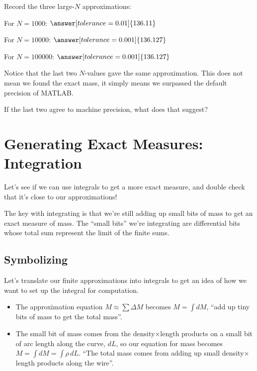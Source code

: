 \documentclass{ximera}
\begin{document}
\begin{problem}
Record the three large-$N$ approximations:

For $N=1000$: $\answer[tolerance=0.01]{136.11}$

For $N=10000$: $\answer[tolerance=0.001]{136.127}$

For $N=100000$: $\answer[tolerance=0.001]{136.127}$

Notice that the last two $N$-values gave the same approximation. This does not mean we found the exact mass, it simply means we surpassed the default precision of MATLAB.

If the last two agree to machine precision, what does that suggest? \begin{multipleChoice}
\end{multipleChoice}
\end{problem}

\section*{Generating Exact Measures: Integration}

Let's see if we can use integrals to get a more exact measure, and double check that it's close to our approximations!

The key with integrating is that we're still adding up small bits of mass to get an exact measure of mass. The ``small bits'' we're integrating are differential bits whose total sum represent the limit of the finite sums.

\subsection*{Symbolizing}

Let's translate our finite approximations into integrals to get an idea of how we want to set up the integral for computation.

\begin{itemize}
\item The approximation equation $M \approx \sum \Delta M$ becomes $M = \int dM$, ``add up tiny bits of mass to get the total mass''.
\item The small bit of mass comes from the density$\times$length products on a small bit of arc length along the curve, $dL$, so our equation for mass becomes $M = \int dM = \int \rho \, dL$. ``The total mass comes from adding up small density$\times$length products along the wire''.
\end{itemize}
\end{document}
